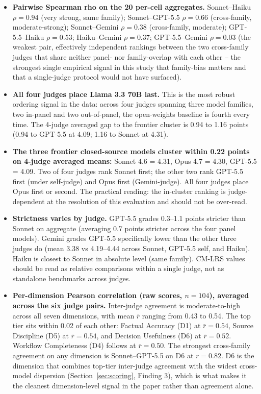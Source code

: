 \documentclass[11pt]{article}
\begin{document}
\begin{itemize}[leftmargin=*,itemsep=0.2em]
\item \textbf{Pairwise Spearman rho on the 20 per-cell aggregates.} Sonnet--Haiku $\rho = 0.94$ (very strong, same family); Sonnet--GPT-5.5 $\rho = 0.66$ (cross-family, moderate-strong); Sonnet--Gemini $\rho = 0.38$ (cross-family, moderate); GPT-5.5--Haiku $\rho = 0.53$; Haiku--Gemini $\rho = 0.37$; GPT-5.5--Gemini $\rho = 0.03$ (the weakest pair, effectively independent rankings between the two cross-family judges that share neither panel- nor family-overlap with each other -- the strongest single empirical signal in this study that family-bias matters and that a single-judge protocol would not have surfaced).
\item \textbf{All four judges place Llama 3.3 70B last.} This is the most robust ordering signal in the data: across four judges spanning three model families, two in-panel and two out-of-panel, the open-weights baseline is fourth every time. The 4-judge averaged gap to the frontier cluster is 0.94 to 1.16 points (0.94 to GPT-5.5 at 4.09; 1.16 to Sonnet at 4.31).
\item \textbf{The three frontier closed-source models cluster within 0.22 points on 4-judge averaged means:} Sonnet 4.6 = 4.31, Opus 4.7 = 4.30, GPT-5.5 = 4.09. Two of four judges rank Sonnet first; the other two rank GPT-5.5 first (under self-judge) and Opus first (Gemini-judge). All four judges place Opus first or second. The practical reading: the in-cluster ranking is judge-dependent at the resolution of this evaluation and should not be over-read.
\item \textbf{Strictness varies by judge.} GPT-5.5 grades 0.3--1.1 points stricter than Sonnet on aggregate (averaging 0.7 points stricter across the four panel models). Gemini grades GPT-5.5 specifically lower than the other three judges do (mean 3.38 vs 4.19--4.44 across Sonnet, GPT-5.5 self, and Haiku). Haiku is closest to Sonnet in absolute level (same family). CM-LRS values should be read as relative comparisons within a single judge, not as standalone benchmarks across judges.
\item \textbf{Per-dimension Pearson correlation (raw scores, $n=104$), averaged across the six judge pairs.} Inter-judge agreement is moderate-to-high across all seven dimensions, with mean $\bar{r}$ ranging from 0.43 to 0.54. The top tier sits within 0.02 of each other: Factual Accuracy (D1) at $\bar{r} = 0.54$, Source Discipline (D5) at $\bar{r} = 0.54$, and Decision Usefulness (D6) at $\bar{r} = 0.52$. Workflow Completeness (D4) follows at $\bar{r} = 0.50$. The strongest cross-family agreement on any dimension is Sonnet--GPT-5.5 on D6 at $r = 0.82$. D6 is the dimension that combines top-tier inter-judge agreement with the widest cross-model dispersion (Section~\ref{sec:scoring}, Finding 3), which is what makes it the cleanest dimension-level signal in the paper rather than agreement alone.
\end{itemize}
\end{document}
